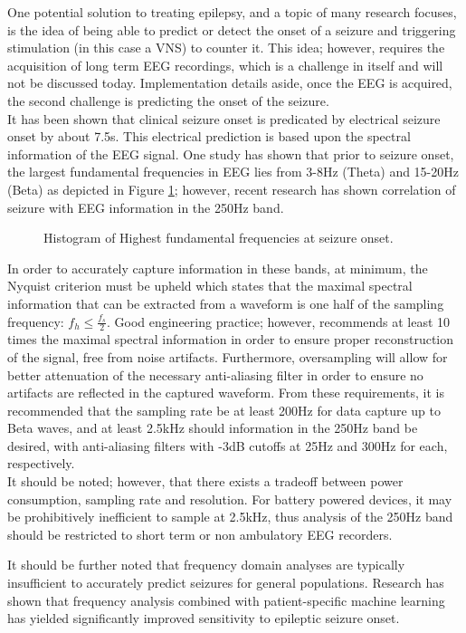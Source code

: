 \documentclass[12pt]{article}
\begin{document}
	One potential solution to treating epilepsy, and a topic of many research focuses, is the idea of being able to predict or detect the onset of a seizure and triggering stimulation (in this case a VNS) to counter it. This idea; however, requires the acquisition of long term EEG recordings, which is a challenge in itself and will not be discussed today. Implementation details aside, once the EEG is acquired, the second challenge is predicting the onset of the seizure. \\
	
	It has been shown that clinical seizure onset is predicated by electrical seizure onset by about 7.5s. This electrical prediction is based upon the spectral information of the EEG signal. One study has shown that prior to seizure onset, the largest fundamental frequencies in EEG lies from 3-8Hz (Theta) and 15-20Hz (Beta) as depicted in Figure \ref{fig:eeg}; however, recent research has shown correlation of seizure with EEG information in the 250Hz band. \\
	
	\begin{figure}[htbp]
		\centering
		\caption{Histogram of Highest fundamental frequencies at seizure onset.}
		\label{fig:eeg}
	\end{figure}

	In order to accurately capture information in these bands, at minimum, the Nyquist criterion must be upheld which states that the maximal spectral information that can be extracted from a waveform is one half of the sampling frequency: $f_h \le \frac{f_s}{2}$. Good engineering practice; however, recommends at least 10 times the maximal spectral information in order to ensure proper reconstruction of the signal, free from noise artifacts. Furthermore, oversampling will allow for better attenuation of the necessary anti-aliasing filter in order to ensure no artifacts are reflected in the captured waveform. From these requirements, it is recommended that the sampling rate be at least 200Hz for data capture up to Beta waves, and at least 2.5kHz should information in the 250Hz band be desired, with anti-aliasing filters with -3dB cutoffs at 25Hz and 300Hz for each, respectively. \\
	
	It should be noted; however, that there exists a tradeoff between power consumption, sampling rate and resolution. For battery powered devices, it may be prohibitively inefficient to sample at 2.5kHz, thus analysis of the 250Hz band should be restricted to short term or non ambulatory EEG recorders. 
	
	It should be further noted that frequency domain analyses are typically insufficient to accurately predict seizures for general populations. Research has shown that frequency analysis combined with patient-specific machine learning has yielded significantly improved sensitivity to epileptic seizure onset. 
\end{document}
